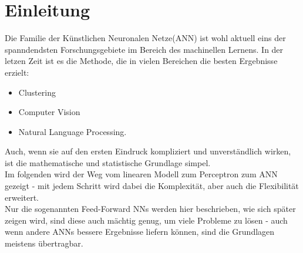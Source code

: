 
\section{Einleitung}
Die Familie der Künstlichen Neuronalen Netze(ANN) ist wohl aktuell eins der spanndendsten Forschungsgebiete im Bereich des machinellen Lernens. In der letzen Zeit ist es die Methode, die in vielen Bereichen die besten Ergebnisse erzielt: 

\begin{itemize}
\item Clustering
\item Computer Vision
\item Natural Language Processing.
\end{itemize}

Auch, wenn sie auf den ersten Eindruck kompliziert und unverständlich wirken, ist die mathematische und statistische Grundlage simpel.\\
Im folgenden wird der Weg vom linearen Modell zum Perceptron zum ANN gezeigt - mit jedem Schritt wird dabei die Komplexität, aber auch die Flexibilität erweitert. \\
Nur die sogenannten Feed-Forward NNs werden hier beschrieben, wie sich später zeigen wird, sind diese auch mächtig genug, um viele Probleme zu lösen - auch wenn andere ANNs bessere Ergebnisse liefern können, sind die Grundlagen meistens übertragbar. 